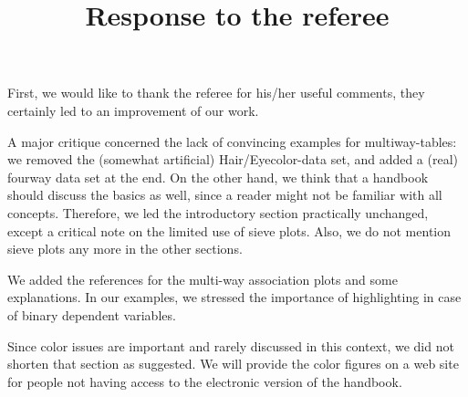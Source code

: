\documentclass[a4paper]{article}
\title{Response to the referee}
\begin{document}
\maketitle

First, we would like to thank the referee for his/her useful comments, 
they certainly led to an improvement of our work.

A major critique concerned the lack of convincing examples for
multiway-tables: we removed the (somewhat artificial) Hair/Eyecolor-data set, and added a
(real) fourway data set at the end. On the other hand, we think that a
handbook should discuss the basics as well, since a reader might not
be familiar with all concepts. Therefore, we led the introductory
section practically unchanged, except a critical note on the limited
use of sieve plots. Also, we do not mention sieve plots any more in
the other sections. 

We added the references for the multi-way
association plots and some explanations. In our examples, we stressed
the importance of highlighting in case of binary dependent variables.

Since color issues are important and rarely discussed in this context, we did not
shorten that section as suggested. We will provide the color figures on a
web site for people not having access to the electronic version of the handbook.
\end{document}
